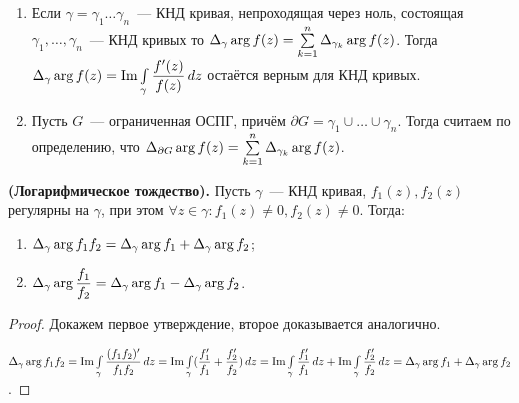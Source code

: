 \begin{note} \leavevmode
\begin{enumerate}[wide=20pt, label=\asbuk*., itemsep=0ex]
\item Если \(\gamma = \gamma_1 \dots \gamma_n\)~--- КНД кривая, непроходящая через ноль, состоящая
    \(\gamma_1, \dots, \gamma_n\)~--- КНД кривых то \(\Delta_{\gamma} \operatorname{arg} f(z) = \sum\limits_{k = 1}^n
    \Delta_{\gamma_k} \operatorname{arg} f(z)\). Тогда \(\Delta_{\gamma} \operatorname{arg} f(z) = \operatorname{Im} \int\limits_{\gamma} 
    \dfrac{f'(z)}{f(z)} \, dz\) остаётся верным для КНД кривых.
\item Пусть \(G\)~--- ограниченная ОСПГ, причём \(\partial G = \gamma_1 \cup \dots \cup \gamma_n\).
    Тогда считаем по определению, что \(\Delta_{\partial G} \operatorname{arg} f(z) = \sum\limits_{k = 1}^n
    \Delta_{\gamma_k} \operatorname{arg} f(z)\).
\end{enumerate}
\end{note}

\begin{statement}
\textbf{(Логарифмическое тождество).} Пусть \(\gamma\)~--- КНД кривая, \(f_1(z), f_2(z)\) регулярны
на \(\gamma\), при этом \(\forall z \in \gamma \colon f_1(z) \ne 0, f_2(z) \ne 0\). Тогда:
\begin{enumerate}[wide=20pt, label=\Roman*., itemsep=0ex]
\item \(\Delta_{\gamma} \operatorname{arg} f_1f_2 = \Delta_{\gamma} \operatorname{arg} f_1 + \Delta_{\gamma} \operatorname{arg} f_2\);
\item \(\Delta_{\gamma} \operatorname{arg} \dfrac{f_1}{f_2} = \Delta_{\gamma} \operatorname{arg} f_1 - \Delta_{\gamma} \operatorname{arg} f_2\).
\end{enumerate}
\end{statement}

\begin{proof}
Докажем первое утверждение, второе доказывается аналогично. 

\(\Delta_{\gamma} \operatorname{arg} f_1f_2 = \operatorname{Im} 
\int\limits_\gamma \dfrac{(f_1f_2)'}{f_1f_2} \, dz= \operatorname{Im} \int\limits_\gamma (\dfrac{f_1'}{f_1} + 
\dfrac{f_2'}{f_2}) \, dz = \operatorname{Im} \int\limits_\gamma \dfrac{f_1'}{f_1}\, dz + \operatorname{Im} \int\limits_\gamma
\dfrac{f_2'}{f_2} \, dz = \Delta_{\gamma} \operatorname{arg} f_1 + \Delta_{\gamma} \operatorname{arg} f_2\).
\end{proof}




